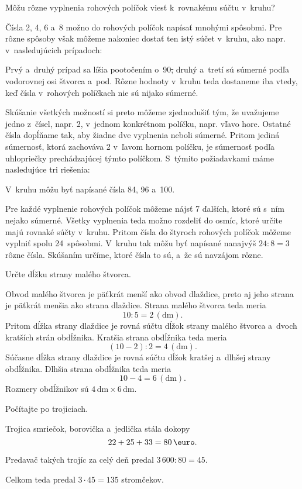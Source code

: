 {%
\napad
Môžu rôzne vyplnenia rohových políčok viesť k~rovnakému súčtu v~kruhu?


\riesenie
Čísla 2, 4, 6 a~8 možno do rohových políčok napísať mnohými spôsobmi.
Pre rôzne spôsoby však môžeme nakoniec dostať ten istý súčet v~kruhu, ako napr. v~nasledujúcich prípadoch:
%


\noindent
Prvý a~druhý prípad sa líšia pootočením o~90\st, druhý a~tretí sú súmerné podľa vodorovnej osi štvorca a~pod.
Rôzne hodnoty v~kruhu teda dostaneme iba vtedy, keď čísla v~rohových políčkach nie sú nijako súmerné.

Skúšanie všetkých možností si preto môžeme zjednodušiť tým, že uvažujeme jedno z~čísel, napr. 2, v~jednom konkrétnom políčku, napr. vľavo hore.
Ostatné čísla dopĺňame tak, aby žiadne dve vyplnenia neboli súmerné.
Pritom jediná súmernosť, ktorá zachováva 2 v~ľavom hornom políčku, je súmernosť podľa uhlopriečky prechádzajúcej týmto políčkom.
S~týmito požiadavkami máme nasledujúce tri riešenia:
%


V~kruhu môžu byť napísané čísla 84, 96 a~100.

\poznamka
Pre každé vyplnenie rohových políčok môžeme nájsť 7 ďalších, ktoré sú s~ním nejako súmerné.
Všetky vyplnenia teda možno rozdeliť do osmíc, ktoré určite majú rovnaké súčty v~kruhu.
Pritom čísla do štyroch rohových políčok môžeme vyplniť spolu 24~spôsobmi.
V~kruhu tak môžu byť napísané nanajvýš $24:8=3$ rôzne čísla.
Skúšaním určíme, ktoré čísla to sú, a~že sú navzájom rôzne.
}

{%
\napad
Určte dĺžku strany malého štvorca.

\riesenie
Obvod malého štvorca je päťkrát menší ako obvod dlaždice, preto aj jeho strana je päťkrát menšia ako strana dlaždice.
Strana malého štvorca teda meria
$$
10:5=2\,(\text{dm}).
$$
Pritom dĺžka strany dlaždice je rovná súčtu dĺžok strany malého štvorca a~dvoch kratších strán obdĺžnika.
Kratšia strana obdĺžnika teda meria
$$
(10-2):2=4\,(\text{dm}).
$$
Súčasne dĺžka strany dlaždice je rovná súčtu dĺžok kratšej a~dlhšej strany obdĺžnika.
Dlhšia strana obdĺžnika teda meria
$$
10-4=6\,(\text{dm}).
$$
Rozmery obdĺžnikov sú $4\,\text{dm}\times 6\,\text{dm}$.
}

{%
\napad
Počítajte po trojiciach.

\riesenie
Trojica smriečok, borovička a~jedlička stála dokopy
$$
22+25+33=80\,\text{\euro}.
$$

Predavač takých trojíc za celý deň predal $3\,600:80=45$.

Celkom teda predal $3\cdot 45=135$ stromčekov.
}

